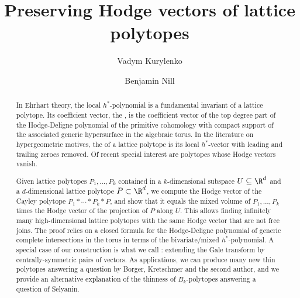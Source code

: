 \documentclass[reqno, 11pt, a4paper, oneside]{amsart}
\author{Vadym Kurylenko}
\author{Benjamin Nill}
\title[Preserving Hodge vectors of lattice polytopes]{Preserving Hodge vectors of lattice polytopes}
\begin{document}
\maketitle

 
 
 \begin{abstract}
 In Ehrhart theory, the local $h^*$-polynomial is a fundamental invariant of a lattice polytope. Its coefficient vector, the , is the coefficient vector of the top degree part of the Hodge-Deligne polynomial of the primitive cohomology with compact support of the associated generic hypersurface in the algebraic torus. In the literature on hypergeometric motives, the  of a lattice polytope is its local $h^*$-vector with leading and trailing zeroes removed. Of recent special interest are  polytopes whose Hodge vectors vanish.

Given lattice polytopes $P_1, \ldots, P_k$ contained in a $k$-dimensional subspace $U \subseteq \R^d$ and a $d$-dimensional lattice polytope $P \subset \R^d$, we compute the Hodge vector of the Cayley polytope $P_1 * \cdots * P_k * P$, and show that it equals the mixed volume of $P_1, \ldots, P_k$ times the Hodge vector of the projection of $P$ along $U$. This allows finding infinitely many high-dimensional lattice polytopes with the same Hodge vector that are not free joins. The proof relies on a closed formula for the Hodge-Deligne polynomial of generic complete intersections in the torus in terms of the bivariate/mixed $h^*$-polynomial. A special case of our construction is what we call : extending the Gale transform by centrally-symmetric pairs of vectors. As applications, we can produce many new thin polytopes answering a question by Borger, Kretschmer and the second author, and we provide an alternative explanation of the thinness of $B_k$-polytopes answering a question of Selyanin. 

 \end{abstract}
\end{document}
